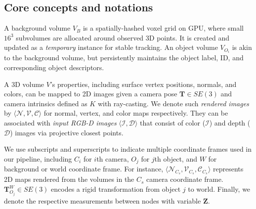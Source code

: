 \subsection{Core concepts and notations} \label{subsec: notation}
A background volume $V_B$ is a spatially-hashed voxel grid on GPU, where small $16^3$ subvolumes are allocated around observed 3D points. It is created and updated as a \textit{temporary} instance for stable tracking. An object volume $V_{O_i}$ is akin to the background volume, but persistently maintains the object label, ID, and corresponding object descriptors.

A 3D volume $V$'s properties, including surface vertex positions, normals, and colors, can be mapped to 2D images given a camera pose $\mathbf{T} \in SE(3)$ and camera intrinsics defined as $K$ with ray-casting. We denote such \textit{rendered images} by \( \langle \mathcal{N}, \mathcal{V}, \mathcal{C} \rangle \)  for normal, vertex, and color maps respectively. They can be associated with \textit{input RGB-D images} $\langle \mathcal{I}, \mathcal{D}\rangle $ that consist of color ($\mathcal{I}$) and depth ($\mathcal{D}$) images via projective closest points.

We use subscripts and superscripts to indicate multiple coordinate frames used in our pipeline, including $C_i$ for $i$th camera, $O_j$ for $j$th object, and $W$ for background or world coordinate frame. For instance,
\(\langle \mathcal{N}_{C_s}, \mathcal{V}_{C_s}, \mathcal{C}_{C_s} \rangle \) represents 2D maps rendered from the volumes in the $C_s$ camera coordinate frame.
$\mathbf{T}_{O_j}^W \in SE(3)$ encodes a rigid transformation from object $j$ to world. Finally, we denote the respective measurements between nodes with variable $\mathbf{Z}$.




